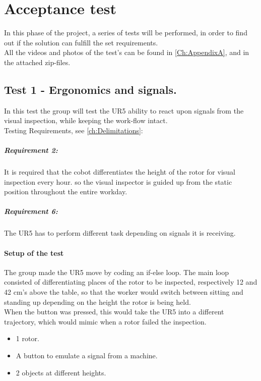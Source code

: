 
\chapter{Acceptance test}\label{ch:Test}

In this phase of the project, a series of tests will be performed, in order to find out if the solution can fulfill the set requirements.\\ 
All the videos and photos of the test's can be found in \ref{Ch:AppendixA}, and in the attached zip-files.




\section{Test 1 - Ergonomics and signals.}

In this test the group will test the UR5 ability to react upon signals from the visual inspection, while keeping the work-flow intact.\\
Testing Requirements, see \ref{ch:Delimitations}:

\paragraph{Requirement 2:} It is required that the cobot differentiates the height of the rotor for visual inspection every hour. so the visual inspector is guided up from the static position throughout the entire workday.
\paragraph{Requirement 6:} The UR5 has to perform different task depending on signals it is receiving.
\subsubsection{Setup of the test}

The group made the UR5 move by coding an if-else loop. The main loop consisted of differentiating places of the rotor to be inspected, respectively 12 and 42 cm's above the table, so that the worker would switch between sitting and standing up depending on the height the rotor is being held.\\
When the button was pressed, this would take the UR5 into a different trajectory, which would mimic when a rotor failed the inspection.

\begin{itemize}
    \item 1  rotor.
    \item A button to emulate a signal from a machine.
    \item 2 objects at different heights. 
\end{itemize}

